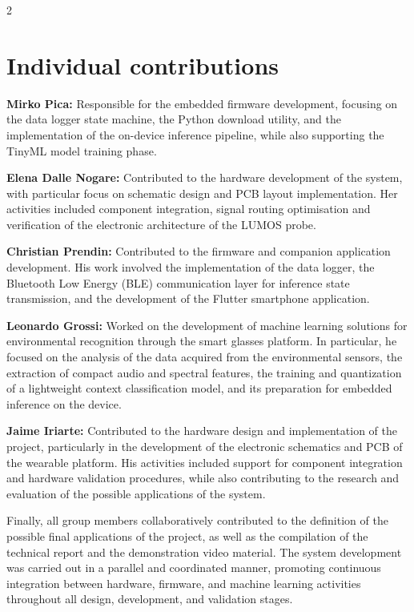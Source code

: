 \documentclass[10pt]{article}
\begin{document}
\begin{multicols}{2}

\section{Individual contributions}
\textbf{Mirko Pica:} Responsible for the embedded firmware development, focusing on the data logger state machine, the Python download utility, and the implementation of the on-device inference pipeline, while also supporting the TinyML model training phase.

\textbf{Elena Dalle Nogare:} Contributed to the hardware development of the system, with particular focus on schematic design and PCB layout implementation. Her activities included component integration, signal routing optimisation and verification of the electronic architecture of the LUMOS probe.

\textbf{Christian Prendin:} Contributed to the firmware and companion application development. His work involved the implementation of the data logger, the Bluetooth Low Energy (BLE) communication layer for inference state transmission, and the development of the Flutter smartphone application.

\textbf{Leonardo Grossi:} Worked on the development of machine learning solutions for environmental recognition through the smart glasses platform. In particular, he focused on the analysis of the data acquired from the environmental sensors, the extraction of compact audio and spectral features, the training and quantization of a lightweight context classification model, and its preparation for embedded inference on the device.

\textbf{Jaime Iriarte:} Contributed to the hardware design and implementation of the project, particularly in the development of the electronic schematics and PCB of the wearable platform. His activities included support for component integration and hardware validation procedures, while also contributing to the research and evaluation of the possible applications of the system.

Finally, all group members collaboratively contributed to the definition of the possible final applications of the project, as well as the compilation of the technical report and the demonstration video material. The system development was carried out in a parallel and coordinated manner, promoting continuous integration between hardware, firmware, and machine learning activities throughout all design, development, and validation stages.



\end{multicols}
\end{document}
